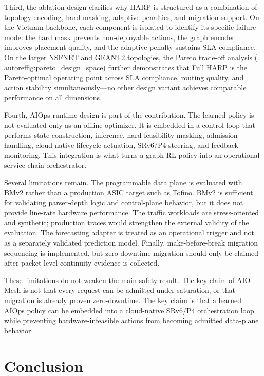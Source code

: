 \documentclass[final,5p]{elsarticle}
\begin{document}
Third, the ablation design clarifies why HARP is structured as a combination of topology encoding, hard masking, adaptive penalties, and migration support. On the Vietnam backbone, each component is isolated to identify its specific failure mode: the hard mask prevents non-deployable actions, the graph encoder improves placement quality, and the adaptive penalty sustains SLA compliance. On the larger NSFNET and GEANT2 topologies, the Pareto trade-off analysis (\\autoref{fig:pareto_design_space}) further demonstrates that Full HARP is the Pareto-optimal operating point across SLA compliance, routing quality, and action stability simultaneously---no other design variant achieves comparable performance on all dimensions.

Fourth, AIOps runtime design is part of the contribution. The learned policy is not evaluated only as an offline optimizer. It is embedded in a control loop that performs state construction, inference, hard-feasibility masking, admission handling, cloud-native lifecycle actuation, SRv6/P4 steering, and feedback monitoring. This integration is what turns a graph RL policy into an operational service-chain orchestrator.

Several limitations remain. The programmable data plane is evaluated with BMv2 rather than a production ASIC target such as Tofino. BMv2 is sufficient for validating parser-depth logic and control-plane behavior, but it does not provide line-rate hardware performance. The traffic workloads are stress-oriented and synthetic; production traces would strengthen the external validity of the evaluation. The forecasting adapter is treated as an operational trigger and not as a separately validated prediction model. Finally, make-before-break migration sequencing is implemented, but zero-downtime migration should only be claimed after packet-level continuity evidence is collected.

These limitations do not weaken the main safety result. The key claim of AIO-Mesh is not that every request can be admitted under saturation, or that migration is already proven zero-downtime. The key claim is that a learned AIOps policy can be embedded into a cloud-native SRv6/P4 orchestration loop while preventing hardware-infeasible actions from becoming admitted data-plane behavior.

\section{Conclusion}
\label{sec:conclusion}
\end{document}
